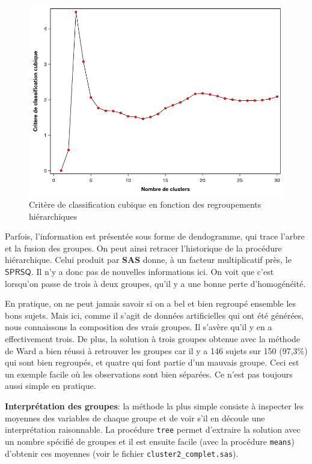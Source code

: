 \documentclass[
  11pt,
  letterpaper,
]{book}
\theoremstyle{definition}
\theoremstyle{definition}
\theoremstyle{definition}
\theoremstyle{remark}
\begin{document}
\begin{figure}

{\centering \includegraphics[width=0.8\linewidth]{figures/04-clustering-e10} 

}

\caption{Critère de classification cubique en fonction des regroupements hiérarchiques}\label{fig:fig4-e9}
\end{figure}

Parfois, l'information est présentée sous forme de dendogramme, qui trace l'arbre et la fusion des groupes. On peut ainsi retracer l'historique de la procédure hiérarchique. Celui produit par \textbf{SAS} donne, à un facteur multiplicatif près, le \(\mathsf{SPRSQ}\). Il n'y a donc pas de nouvelles informations ici. On voit que c'est lorsqu'on passe de trois à deux groupes, qu'il y a une bonne perte d'homogénéité.

En pratique, on ne peut jamais savoir si on a bel et bien regroupé ensemble les bons sujets. Mais ici, comme il s'agit de données artificielles qui ont été générées, nous connaissons la composition des vrais groupes. Il s'avère qu'il y en a effectivement trois. De plus, la solution à trois groupes obtenue avec la méthode de Ward a bien réussi à retrouver les groupes car il y a 146 sujets sur 150 (97,3\%) qui sont bien regroupés, et quatre qui font partie d'un mauvais groupe. Ceci est un exemple facile où les observations sont bien séparées. Ce n'est pas toujours aussi simple en pratique.

\textbf{Interprétation des groupes}: la méthode la plus simple consiste à inspecter les moyennes des variables de chaque groupe et de voir s'il en découle une interprétation raisonnable. La procédure \texttt{tree} permet d'extraire la solution avec un nombre spécifié de groupes et il est ensuite facile (avec la procédure \texttt{means}) d'obtenir ces moyennes (voir le fichier \texttt{cluster2\_complet.sas}).
\end{document}
